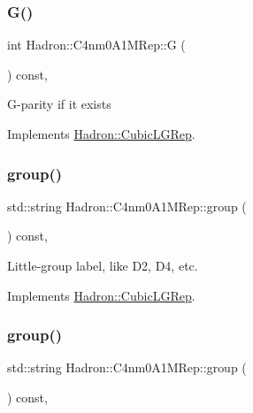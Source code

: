 \subsubsection{\texorpdfstring{G()}{G()}\hspace{0.1cm}{\footnotesize\ttfamily [2/2]}}
{\footnotesize\ttfamily int Hadron\+::\+C4nm0\+A1\+M\+Rep\+::G (\begin{DoxyParamCaption}{ }\end{DoxyParamCaption}) const\hspace{0.3cm}{\ttfamily [inline]}, {\ttfamily [virtual]}}

G-\/parity if it exists 

Implements \mbox{\hyperlink{structHadron_1_1CubicLGRep_ace26f7b2d55e3a668a14cb9026da5231}{Hadron\+::\+Cubic\+L\+G\+Rep}}.

\mbox{\label{structHadron_1_1C4nm0A1MRep_ab9dfbb74d6f659e9ec0131a37976b77a}} 
\subsubsection{\texorpdfstring{group()}{group()}\hspace{0.1cm}{\footnotesize\ttfamily [1/2]}}
{\footnotesize\ttfamily std\+::string Hadron\+::\+C4nm0\+A1\+M\+Rep\+::group (\begin{DoxyParamCaption}{ }\end{DoxyParamCaption}) const\hspace{0.3cm}{\ttfamily [inline]}, {\ttfamily [virtual]}}

Little-\/group label, like D2, D4, etc. 

Implements \mbox{\hyperlink{structHadron_1_1CubicLGRep_a9bdb14b519a611d21379ed96a3a9eb41}{Hadron\+::\+Cubic\+L\+G\+Rep}}.

\mbox{\label{structHadron_1_1C4nm0A1MRep_ab9dfbb74d6f659e9ec0131a37976b77a}} 
\subsubsection{\texorpdfstring{group()}{group()}\hspace{0.1cm}{\footnotesize\ttfamily [2/2]}}
{\footnotesize\ttfamily std\+::string Hadron\+::\+C4nm0\+A1\+M\+Rep\+::group (\begin{DoxyParamCaption}{ }\end{DoxyParamCaption}) const\hspace{0.3cm}{\ttfamily [inline]}, {\ttfamily [virtual]}}

